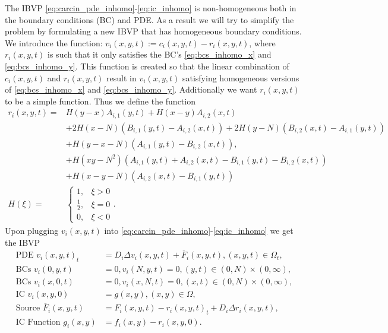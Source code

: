 \documentclass[\main/thesis.tex]{subfiles}
\begin{document}
The IBVP \eqref{eq:carcin_pde_inhomo}-\eqref{eq:ic_inhomo} is non-homogeneous both in the boundary conditions (BC) and PDE. As a result we will try to simplify the problem by formulating a new IBVP that 
has homogeneous boundary conditions. We introduce the function: $v_i(x, y, t) {:=} c_i(x, y, t) {-} r_i(x, y, t)$, where $r_i(x, y, t)$ is such that it only satisfies the BC's \eqref{eq:bcs_inhomo_x} and \eqref{eq:bcs_inhomo_y}. This function 
is created so that the linear combination of $c_i(x, y, t)$ and $r_i(x, y, t)$ result in $v_i(x, y, t)$ satisfying homogeneous versions of \eqref{eq:bcs_inhomo_x} and \eqref{eq:bcs_inhomo_y}. Additionally we want $r_i(x, y, t)$ to be a simple function.
Thus we define the function
\begin{align}
r_i(x, y, t) {=} &H(y{-}x)A_{i, 1}(y, t) {+} H(x{-}y)A_{i, 2}(x, t) \nonumber\\
				 &{+} 2H(x{-}N)(B_{i, 1}(y, t) {-} A_{i, 2}(x, t)) {+} 2H(y{-}N)(B_{i, 2}(x, t) {-} A_{i, 1}(y, t)) \nonumber\\
				 &{+} H(y{-}x{-}N)(A_{i, 1}(y, t) {-} B_{i, 2}(x, t)), \label{eq:ref_carcin_concen}\\
                 &{+} H(xy{-}N^2)(A_{i, 1}(y, t) {+} A_{i, 2}(x, t) {-} B_{i, 1}(y, t) {-} B_{i, 2}(x, t)) \nonumber\\
                 &{+} H(x{-}y{-}N)(A_{i, 2}(x, t) {-} B_{i, 1}(y, t)) \nonumber\\
H(\xi) {=} &\begin{cases}
	1, &\xi {>} 0 \\
	\frac{1}{2}, &\xi {=} 0 \\
	0, &\xi {<} 0
\end{cases}.
\label{eq:heaviside}
\end{align}
Upon plugging $v_i(x, y, t)$ into \eqref{eq:carcin_pde_inhomo}-\eqref{eq:ic_inhomo} we get the IBVP
\begin{align}
\text{PDE } v_i(x, y, t)_t &{=} D_i\Delta v_i(x, y, t) {+} \overline{F}_i(x, y, t), (x, y, t) {\in} \Omega_t,
\label{eq:carcin_pde_inhomo_v} \\
\text{BCs } v_i(0, y, t) &{=} 0, v_i(N, y, t) {=} 0, (y, t) {\in} (0, N) {\times} (0, \infty),
\label{eq:bcs_homo_x} \\
\text{BCs } v_i(x, 0, t) &{=} 0, v_i(x, N, t) {=} 0, (x, t) {\in} (0, N) {\times} (0, \infty),
\label{eq:bcs_homo_y} \\
\text{IC } v_i(x, y, 0) &{=} g(x, y), (x, y) {\in} \Omega,
\label{eq:ic_inhomo_v} \\
\text{Source } \overline{F}_i(x, y, t) &{=} F_i(x, y, t) {-} r_i(x, y, t)_t {+} D_i\Delta r_i(x, y, t),
\label{eq:source_term_v} \\
\text{IC Function } g_i(x, y) &{=} f_i(x, y) {-} r_i(x, y, 0).
\label{eq:ic_func_inhomo_v}
\end{align}
\end{document}
